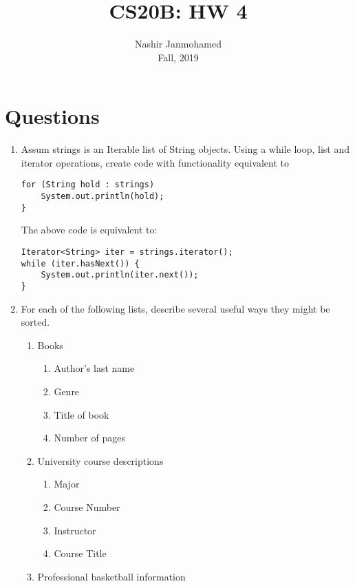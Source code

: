 \documentclass[12pt]{article}
\begin{document}
 
 
\title{CS20B: HW 4}
\author{Nashir Janmohamed\\
Fall, 2019}

\maketitle
\section{Questions}
\begin{enumerate}
  \item Assum strings is an Iterable list of String objects. Using a while loop, list and iterator operations, create code with functionality equivalent to
  \begin{lstlisting}
for (String hold : strings)
    System.out.println(hold);
}
  \end{lstlisting}
  The above code is equivalent to:
    \begin{lstlisting}
Iterator<String> iter = strings.iterator();
while (iter.hasNext()) {
    System.out.println(iter.next());
}
  \end{lstlisting}
  \item For each of the following lists, describe several useful ways they might be sorted.
  \begin{enumerate}
    \item Books
    \begin{enumerate}
      \item Author's last name
      \item Genre
      \item Title of book
      \item Number of pages
    \end{enumerate}
    \item University course descriptions
    \begin{enumerate}
      \item Major
      \item Course Number
      \item Instructor
      \item Course Title
    \end{enumerate}
    \item Professional basketball information
    \begin{enumerate}

\end{enumerate}
\end{enumerate}
\end{enumerate}
\end{document}
